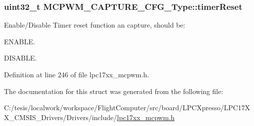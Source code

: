 \hypertarget{struct_m_c_p_w_m___c_a_p_t_u_r_e___c_f_g___type_af4c01f3f3791aa98051d65b42e25b30b}{
\subsubsection[{timer\-Reset}]{\setlength{\rightskip}{0pt plus 5cm}uint32\-\_\-t {\bf \-M\-C\-P\-W\-M\-\_\-\-C\-A\-P\-T\-U\-R\-E\-\_\-\-C\-F\-G\-\_\-\-Type\-::timer\-Reset}}}\label{struct_m_c_p_w_m___c_a_p_t_u_r_e___c_f_g___type_af4c01f3f3791aa98051d65b42e25b30b}
\-Enable/\-Disable \-Timer reset function an capture, should be\-:
\begin{DoxyItemize}
\item \-E\-N\-A\-B\-L\-E.
\item \-D\-I\-S\-A\-B\-L\-E. 
\end{DoxyItemize}

\-Definition at line 246 of file lpc17xx\-\_\-mcpwm.\-h.



\-The documentation for this struct was generated from the following file\-:\begin{DoxyCompactItemize}
\item 
\-C\-:/tesis/localwork/workspace/\-Flight\-Computer/src/board/\-L\-P\-C\-Xpresso/\-L\-P\-C17\-X\-X\-\_\-\-C\-M\-S\-I\-S\-\_\-\-Drivers/\-Drivers/include/\hyperlink{lpc17xx__mcpwm_8h}{lpc17xx\-\_\-mcpwm.\-h}\end{DoxyCompactItemize}
